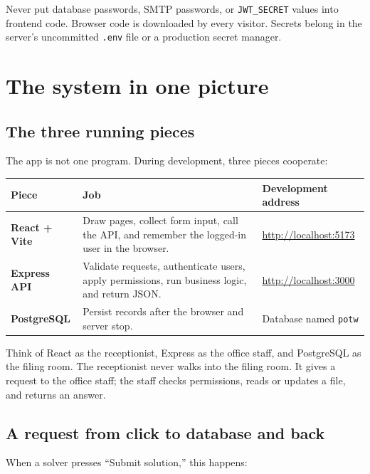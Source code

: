 \documentclass[11pt,oneside]{book}
\newcommand{\file}[1]{\texttt{#1}}
\newcommand{\code}[1]{\texttt{#1}}
\begin{document}
\begin{warningbox}
Never put database passwords, SMTP passwords, or \code{JWT\_SECRET} values into frontend code. Browser code is downloaded by every visitor. Secrets belong in the server's uncommitted \file{.env} file or a production secret manager.
\end{warningbox}

\mainmatter

\chapter{The system in one picture}

\section{The three running pieces}
The app is not one program. During development, three pieces cooperate:

\begin{center}
\begin{tabularx}{0.94\textwidth}{>{\bfseries\sffamily}p{} X p{}}
\toprule
Piece & Job & Development address \\
\midrule
React + Vite & Draw pages, collect form input, call the API, and remember the logged-in user in the browser. & \url{http://localhost:5173} \\
Express API & Validate requests, authenticate users, apply permissions, run business logic, and return JSON. & \url{http://localhost:3000} \\
PostgreSQL & Persist records after the browser and server stop. & Database named \code{potw} \\
\bottomrule
\end{tabularx}
\end{center}

\begin{mentalbox}
Think of React as the receptionist, Express as the office staff, and PostgreSQL as the filing room. The receptionist never walks into the filing room. It gives a request to the office staff; the staff checks permissions, reads or updates a file, and returns an answer.
\end{mentalbox}

\section{A request from click to database and back}
When a solver presses ``Submit solution,'' this happens:
\end{document}
